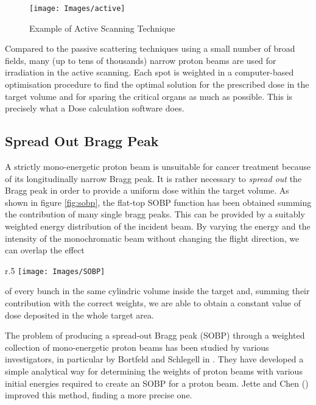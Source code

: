 \documentclass[12pt, a4paper, twoside]{book}
\begin{document}
\begin{figure}[t]
{\texttt{[image: Images/active]}}
\caption{Example of Active Scanning Technique}
\label{fig:active}
\end{figure}

Compared to the passive scattering techniques using a small number of broad fields, many (up to tens of thousands) narrow proton beams are used for irradiation in the active scanning. Each spot is weighted in a computer-based optimisation procedure to find the optimal solution for the prescribed dose in the target volume and for sparing the critical organs as much as possible.
This is precisely what a Dose calculation software does.



\subsection{Spread Out Bragg Peak}
\label{sec:sobp}

A strictly mono-energetic proton beam is unsuitable for cancer treatment because of its longitudinally narrow Bragg peak. 
It is rather necessary to \emph{spread out} the Bragg peak in order to provide a uniform dose within the target volume. As shown in figure  \ref{fig:sobp}, the flat-top SOBP function has been obtained summing the contribution of many single bragg peaks. This can be provided by a suitably weighted energy distribution of the incident beam. 
By varying the energy and the intensity of the monochromatic beam without changing the flight direction, we can overlap the effect
\begin{wrapfigure}{r}{.5\textwidth}
{\texttt{[image: Images/SOBP]}}
\caption{Comparison between protons Spread Out Bragg Peak and photons energy loss in matter}
\label{fig:sobp}
\end{wrapfigure}
\noindent of every bunch in the same cylindric volume inside the target and, summing their contribution with the correct weights, we are able to obtain a constant value of dose deposited in the whole target area.


The problem of producing a spread-out Bragg peak (SOBP) through a weighted collection of mono-energetic proton beams has been studied by various investigators, in particular by Bortfeld and Schlegell in \cite{bort:SOBP}. They have developed a simple analytical way for determining the weights of proton beams with various initial energies required to create an SOBP for a proton beam. Jette and Chen (\cite{jett:SOBP}) improved this method, finding a more precise one. %
\end{document}
